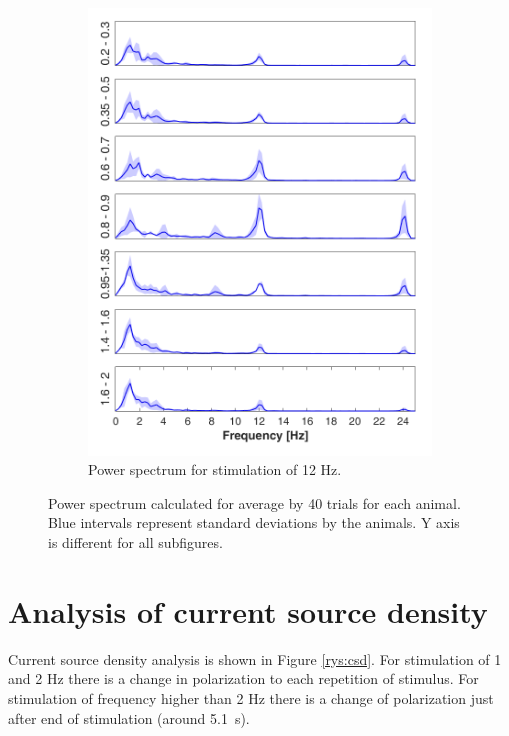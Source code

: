 \documentclass{pracalicmgr}
\begin{document}
\begin{figure}[H]
\begin{subfigure}{.5\textwidth}
		\includegraphics[width=1.\linewidth]{widmo_12Hz.png}
		\caption{Power spectrum for stimulation of 12 Hz.}
		\label{rys:widmo_12Hz}
	\end{subfigure}
	
	\caption{Power spectrum calculated for average by 40 trials for each animal. Blue intervals represent standard deviations by the animals. Y axis is different for all subfigures.}
	\label{rys:srednie_widmo}
	
\end{figure}    
\section{Analysis of current source density}
Current source density analysis is shown in Figure \ref{rys:csd}. For stimulation of 1 and 2 Hz there is a change in polarization to each repetition of stimulus. For stimulation of frequency higher than 2 Hz there is a change of polarization just after end of stimulation (around 5.1~s). 
\end{document}
